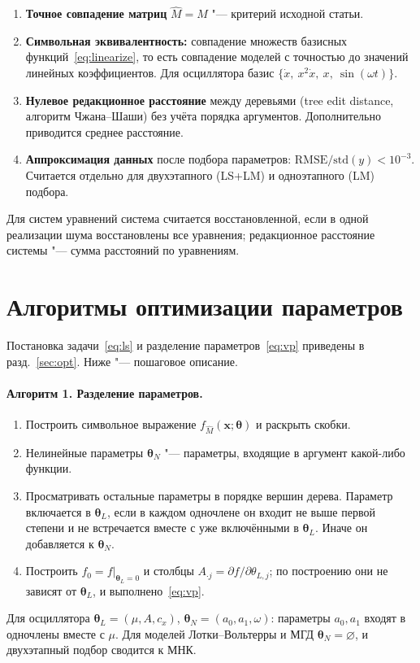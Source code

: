 \documentclass[12pt]{article}
\newcommand{\vx}{\mathbf{x}}
\newcommand{\tht}{\bm{\theta}}
\begin{document}
\begin{enumerate}[nosep]
\item \textbf{Точное совпадение матриц} $\hat M=M$ "--- критерий исходной статьи.
\item \textbf{Символьная эквивалентность:} совпадение множеств базисных функций~\eqref{eq:linearize}, то есть совпадение моделей с точностью до значений линейных коэффициентов. Для осциллятора базис $\{\dot x,\ x^2\dot x,\ x,\ \sin(\omega t)\}$.
\item \textbf{Нулевое редакционное расстояние} между деревьями (tree edit distance, алгоритм Чжана--Шаши) без учёта порядка аргументов. Дополнительно приводится среднее расстояние.
\item \textbf{Аппроксимация данных} после подбора параметров: $\mathrm{RMSE}/\mathrm{std}(y)<10^{-3}$. Считается отдельно для двухэтапного (LS+LM) и одноэтапного (LM) подбора.
\end{enumerate}
Для систем уравнений система считается восстановленной, если в одной реализации шума восстановлены все уравнения; редакционное расстояние системы "--- сумма расстояний по уравнениям.

\section{Алгоритмы оптимизации параметров}\label{sec:algs}

Постановка задачи~\eqref{eq:ls} и разделение параметров~\eqref{eq:vp} приведены в разд.~\ref{sec:opt}. Ниже "--- пошаговое описание.

\paragraph{Алгоритм 1. Разделение параметров.}
\begin{enumerate}[nosep]
\item Построить символьное выражение $f_{\hat M}(\vx;\tht)$ и раскрыть скобки.
\item Нелинейные параметры $\tht_N$ "--- параметры, входящие в аргумент какой-либо функции.
\item Просматривать остальные параметры в порядке вершин дерева. Параметр включается в $\tht_L$, если в каждом одночлене он входит не выше первой степени и не встречается вместе с уже включёнными в $\tht_L$. Иначе он добавляется к $\tht_N$.
\item Построить $f_0=f|_{\tht_L=0}$ и столбцы $A_{\cdot j}=\partial f/\partial\theta_{L,j}$; по построению они не зависят от $\tht_L$, и выполнено~\eqref{eq:vp}.
\end{enumerate}
Для осциллятора $\tht_L=(\mu,A,c_x)$, $\tht_N=(a_0,a_1,\omega)$: параметры $a_0,a_1$ входят в одночлены вместе с $\mu$. Для моделей Лотки--Вольтерры и МГД $\tht_N=\varnothing$, и двухэтапный подбор сводится к МНК.
\end{document}
